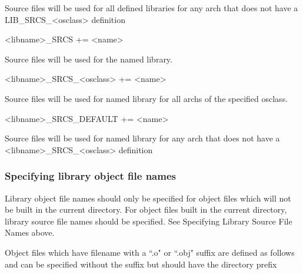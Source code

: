 \begin{description}
Source files will be used for all defined libraries for any arch that does not have a LIB\_SRCS\_\textless{}osclass\textgreater{} 
definition

\item

\item \textless{}libname\textgreater{}\_SRCS += \textless{}name\textgreater{}

Source files will be used for the named library.

\item \textless{}libname\textgreater{}\_SRCS\_\textless{}osclass\textgreater{} += \textless{}name\textgreater{}

Source files will be used for named library for all archs of the specified osclass.

\item \textless{}libname\textgreater{}\_SRCS\_DEFAULT += \textless{}name\textgreater{}

Source files will be used for named library for any arch that does not have a \textless{}libname\textgreater{}\_SRCS\_\textless{}osclass\textgreater{} 
definition

\end{description}

\subsubsection{Specifying library object file names}

Library object file names should only be specified for object files which will not be built in the current directory. For 
object files built in the current directory, library source file names should be specified. See Specifying Library Source File 
Names above.

Object files which have filename with a ``.o" or ``.obj" suffix are defined as follows and can be specified without the suffix 
but should have the directory prefix 

